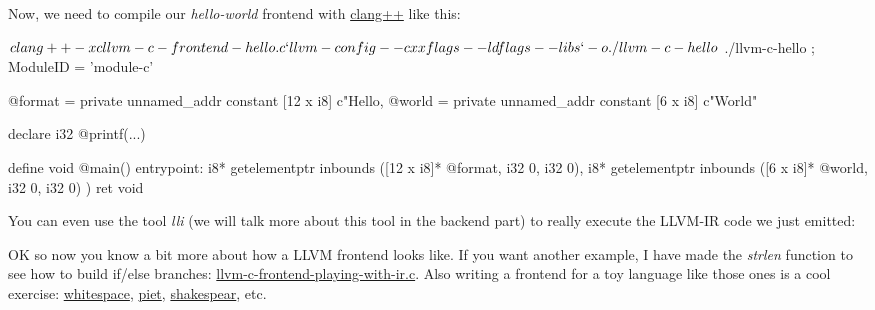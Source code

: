 \documentclass[a4paper, 11pt, notitlepage]{report}
\begin{document}
Now, we need to compile our \textit{hello-world} frontend with \href{http://clang.llvm.org/}{clang++} like this:
\begin{consolecode}
$ clang++ -x c llvm-c-frontend-hello.c `llvm-config --cxxflags --ldflags --libs` -o ./llvm-c-hello
$ ./llvm-c-hello
; ModuleID = 'module-c'

@format = private unnamed_addr constant [12 x i8] c"Hello, %
@world = private unnamed_addr constant [6 x i8] c"World"

declare i32 @printf(...)

define void @main() {
entrypoint:
    i8* getelementptr inbounds ([12 x i8]* @format, i32 0, i32 0),
    i8* getelementptr inbounds ([6 x i8]* @world, i32 0, i32 0)
  )
  ret void
}
\end{consolecode}

You can even use the tool \textit{lli} (we will talk more about this tool in the backend part) to really execute the LLVM-IR code we just emitted:
OK so now you know a bit more about how a LLVM frontend looks like. If you want another example, I have made the \textit{strlen} function to see how to build if/else branches: \href{https://github.com/0vercl0k/stuffz/blob/master/llvm-funz/llvm-c-frontend-playing-with-ir.c}{llvm-c-frontend-playing-with-ir.c}. Also writing a frontend for a toy language like those ones is a cool exercise: \href{http://en.wikipedia.org/wiki/Whitespace_(programming_language)}{whitespace}, \href{http://en.wikipedia.org/wiki/Esoteric_programming_language#Piet}{piet}, \href{http://en.wikipedia.org/wiki/Shakespeare_(programming_language)}{shakespear}, etc.
\end{document}
